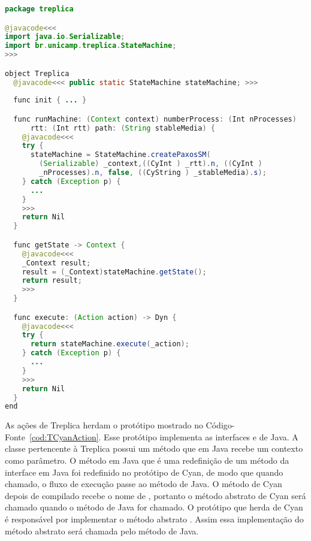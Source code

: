 \vspace{1cm} 

\begin{lstlisting}[language=Java, caption={Código Fonte de \textbf{Treplica}}, label={cod:TCyanTreplica},float]
package treplica

@javacode<<< 
import java.io.Serializable;
import br.unicamp.treplica.StateMachine;
>>>

object Treplica
  @javacode<<< public static StateMachine stateMachine; >>>
  
  func init { ... }

  func runMachine: (Context context) numberProcess: (Int nProcesses) 
      rtt: (Int rtt) path: (String stableMedia) {
    @javacode<<<
    try {        
      stateMachine = StateMachine.createPaxosSM( 
        (Serializable) _context,((CyInt ) _rtt).n, ((CyInt ) 
        _nProcesses).n, false, ((CyString ) _stableMedia).s);
    } catch (Exception p) {
      ...
    }        
    >>>
    return Nil
  }

  func getState -> Context {  
    @javacode<<<
    _Context result;
    result = (_Context)stateMachine.getState();      
    return result;        
    >>>
  }

  func execute: (Action action) -> Dyn {    
    @javacode<<<
    try { 
      return stateMachine.execute(_action); 
    } catch (Exception p) {
      ...
    }        
    >>>
    return Nil
  }
end

\end{lstlisting}

As ações de Treplica herdam o protótipo  mostrado no Código-Fonte~\ref{cod:TCyanAction}. Esse protótipo implementa as interfaces  e  de Java. A classe  pertencente à Treplica possui um método  que em Java recebe um contexto como parâmetro. O método  em Java que é uma redefinição de um método da interface  em Java foi redefinido no protótipo  de Cyan, de modo que quando chamado, o fluxo de execução passe ao método  de Java. O método  de Cyan depois de compilado recebe o nome de , portanto o método abstrato  de Cyan será chamado quando o método  de Java for chamado. O protótipo que herda  de Cyan é responsável por implementar o método abstrato . Assim essa implementação do método abstrato será chamada pelo método  de Java.


